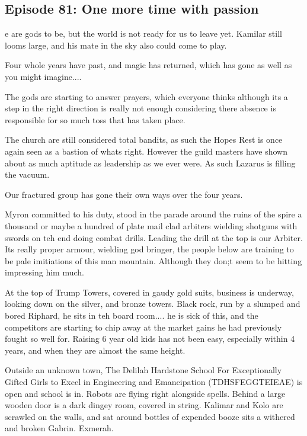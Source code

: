 \subsection{Episode 81: One more time with passion}

e are gods to be, but the world is not ready for us to leave yet. Kamilar still looms large, and his mate in the sky also could come to play.\medskip

Four whole years have past, and magic has returned, which has gone as well as you might imagine....\medskip

The gods are starting to answer prayers, which everyone thinks although its a step in the right direction is really not enough considering there absence is responsible for so much toss that has taken place.\medskip

The church are still considered total bandits, as such the Hopes Rest is once again seen as a bastion of whats right. However the guild masters have shown about as much aptitude as leadership as we ever were. As such Lazarus is filling the vacuum.\medskip

Our fractured group has gone their own ways over the four years.\medskip

Myron committed to his duty, stood in the parade around the ruins of the spire a thousand or maybe a hundred of plate mail clad arbiters wielding shotguns with swords on teh end doing combat drills. Leading the drill at the top is our Arbiter. Its really proper armour, wielding god bringer, the people below are training to be pale imitiations of this man mountain. Although they don;t seem to be hitting impressing him much.\medskip

At the top of Trump Towers, covered in gaudy gold suits, business is underway, looking down on the silver, and bronze towers. Black rock, run by a slumped and bored Riphard, he sits in teh board room.... he is sick of this, and the competitors are starting to chip away at the market gains he had previously fought so well for. Raising 6 year old kids has not been easy, especially within 4 years, and when they are almost the same height.\medskip

Outside an unknown town, The Delilah Hardstone School For Exceptionally Gifted Girls to Excel in Engineering and Emancipation (TDHSFEGGTEIEAE) is open and school is in. Robots are flying right alongside spells. Behind a large wooden door is a dark dingey room, covered in string. Kalimar and Kolo are scrawled on the walls, and sat around bottles of expended booze sits a withered and broken Gabrin. Exmerah.\medskip

